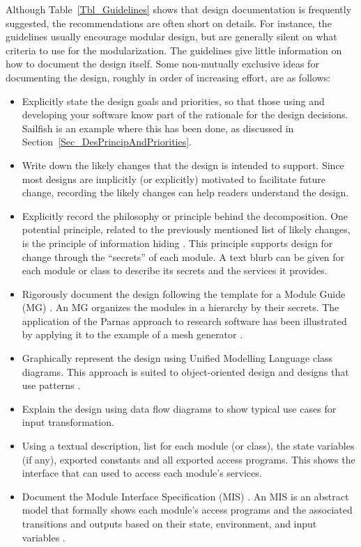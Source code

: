 \documentclass[final, 3p, times, authoryear]{elsarticle}
\begin{document}
Although Table~\ref{Tbl_Guidelines} shows that design documentation is
frequently suggested, the recommendations are often short on details. For
instance, the guidelines usually encourage modular design, but are generally
silent on what criteria to use for the modularization.  The guidelines give
little information on how to document the design itself. Some non-mutually
exclusive ideas for documenting the design, roughly in order of increasing
effort, are as follows:

\begin{itemize}
	\item Explicitly state the design goals and priorities, so that those using
	and developing your software know part of the rationale for the design
	decisions. Sailfish is an example where this has been done, as discussed in
	Section~\ref{Sec_DesPrincipAndPriorities}.
	\item Write down the likely changes that the design is intended to support.
	Since most designs are implicitly (or explicitly) motivated to facilitate
	future change, recording the likely changes can help readers understand the
	design.
	\item Explicitly record the philosophy or principle behind the
	decomposition. One potential principle, related to the previously mentioned
	list of likely changes, is the principle of information hiding
	\citep{Parnas1972a}.  This principle supports design for change through the
	``secrets'' of each module. A text blurb can be given for each module or
	class to describe its secrets and the services it provides.
	\item Rigorously document the design following the template for a Module
	Guide (MG) \citep{ParnasEtAl1984}.  An MG organizes the modules in a
	hierarchy by their secrets. The application of the Parnas approach to
	research software has been illustrated by applying it to the example of a
	mesh generator \citep{SmithAndYu2009}.
	\item Graphically represent the design using Unified Modelling Language
	class diagrams.  This approach is suited to object-oriented design and
	designs that use patterns \citep{Gamma1995}.
	\item Explain the design using data flow diagrams to show typical use cases
	for input transformation.
	\item Using a textual description, list for each module (or class), the
	state variables (if any), exported constants and all exported access
	programs.  This shows the interface that can used to access each module's
	services.
	\item Document the Module Interface Specification (MIS)
	\citep{HoffmanAndStrooper1995}. An MIS is an abstract model that formally
	shows each module's access programs and the associated transitions and
	outputs based on their state, environment, and input variables
	\citep{ElSheikhEtAl2004, SmithAndYu2009}.
\end{itemize}
\end{document}
